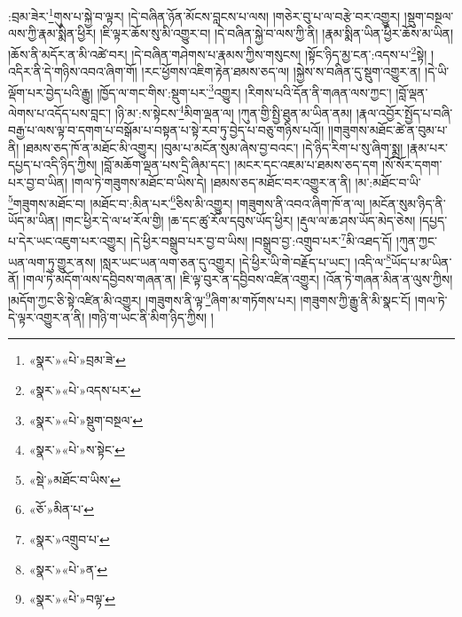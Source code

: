 :བྲམ་ཟེར་\footnote{«སྣར་»«པེ་»བྲམ་ཟེ་}གུས་པ་སྐྱེ་བ་ལྟར། །དེ་བཞིན་ཉོན་མོངས་བླངས་པ་ལས། །གཅེར་བུ་པ་ལ་བརྩེ་བར་འགྱུར། །སྡུག་བསྔལ་ལས་ཀྱི་རྣམ་སྨིན་ཕྱིར། །ཇི་ལྟར་ཆོས་སུ་མི་འགྱུར་བ། །དེ་བཞིན་སྐྱེ་བ་ལས་ཀྱི་ནི། །རྣམ་སྨིན་ཡིན་ཕྱིར་ཆོས་མ་ཡིན། །ཆོས་ནི་མདོར་ན་མི་འཚེ་བར། །དེ་བཞིན་གཤེགས་པ་རྣམས་ཀྱིས་གསུངས། །སྟོང་ཉིད་མྱ་ངན་:འདས་པ་\footnote{«སྣར་»«པེ་»འདས་པར་}སྟེ། །འདིར་ནི་དེ་གཉིས་འབའ་ཞིག་གོ། །རང་ཕྱོགས་འཇིག་རྟེན་ཐམས་ཅད་ལ། །སྐྱེས་ས་བཞིན་དུ་སྡུག་འགྱུར་ན། །དེ་ཡི་ལྡོག་པར་བྱེད་པའི་རྒྱུ། །ཁྱོད་ལ་གང་གིས་:སྡུག་པར་\footnote{«སྣར་»«པེ་»སྡུག་བསྔལ་}འགྱུར། །རིགས་པའི་དོན་ནི་གཞན་ལས་ཀྱང་། །བློ་ལྡན་ལེགས་པ་འདོད་པས་བླང་། །ཉི་མ་:ས་སྟེངས་\footnote{«སྣར་»«པེ་»ས་སྟེང་}མིག་ལྡན་ལ། །ཀུན་གྱི་སྤྱི་ཐུན་མ་ཡིན་ནམ། །རྣལ་འབྱོར་སྤྱོད་པ་བཞི་བརྒྱ་པ་ལས་ལྟ་བ་དགག་པ་བསྒོམ་པ་བསྟན་པ་སྟེ་རབ་ཏུ་བྱེད་པ་བཅུ་གཉིས་པའོ།། །།གཟུགས་མཐོང་ཚེ་ན་བུམ་པ་ནི། །ཐམས་ཅད་ཁོ་ན་མཐོང་མི་འགྱུར། །བུམ་པ་མངོན་སུམ་ཞེས་བྱ་བའང་། །དེ་ཉིད་རིག་པ་སུ་ཞིག་སྨྲ། །རྣམ་པར་དཔྱད་པ་འདི་ཉིད་ཀྱིས། །བློ་མཆོག་ལྡན་པས་དྲི་ཞིམ་དང་། །མངར་དང་འཇམ་པ་ཐམས་ཅད་དག །སོ་སོར་དགག་པར་བྱ་བ་ཡིན། །གལ་ཏེ་གཟུགས་མཐོང་བ་ཡིས་དེ། །ཐམས་ཅད་མཐོང་བར་འགྱུར་ན་ནི། །མ་:མཐོང་བ་ཡི་\footnote{«སྡེ་»མཐོང་བ་ཡིས་}གཟུགས་མཐོང་བ། །མཐོང་བ་:མིན་པར་\footnote{«ཅོ་»མིན་པ་}ཅིས་མི་འགྱུར། །གཟུགས་ནི་འབའ་ཞིག་ཁོ་ན་ལ། །མངོན་སུམ་ཉིད་ནི་ཡོད་མ་ཡིན། །གང་ཕྱིར་དེ་ལ་ཕ་རོལ་གྱི། །ཆ་དང་ཚུ་རོལ་དབུས་ཡོད་ཕྱིར། །རྡུལ་ལ་ཆ་ཤས་ཡོད་མེད་ཅེས། །དཔྱད་པ་དེར་ཡང་འཇུག་པར་འགྱུར། །དེ་ཕྱིར་བསྒྲུབ་པར་བྱ་བ་ཡིས། །བསྒྲུབ་བྱ་:འགྲུབ་པར་\footnote{«སྣར་»འགྲུབ་པ་}མི་འཐད་དོ། །ཀུན་ཀྱང་ཡན་ལག་ཏུ་གྱུར་ནས། །སླར་ཡང་ཡན་ལག་ཅན་དུ་འགྱུར། །དེ་ཕྱིར་ཡི་གེ་བརྗོད་པ་ཡང་། །འདི་ལ་\footnote{«སྣར་»«པེ་»ན་}ཡོད་པ་མ་ཡིན་ནོ། །གལ་ཏེ་མདོག་ལས་དབྱིབས་གཞན་ན། །ཇི་ལྟ་བུར་ན་དབྱིབས་འཛིན་འགྱུར། །འོན་ཏེ་གཞན་མིན་ན་ལུས་ཀྱིས། །མདོག་ཀྱང་ཅི་སྟེ་འཛིན་མི་འགྱུར། །གཟུགས་ནི་ལྟ་\footnote{«སྣར་»«པེ་»བལྟ་}ཞིག་མ་གཏོགས་པར། །གཟུགས་ཀྱི་རྒྱུ་ནི་མི་སྣང་ངོ། །གལ་ཏེ་དེ་ལྟར་འགྱུར་ན་ནི། །གཉི་ག་ཡང་ནི་མིག་ཉིད་ཀྱིས། །
